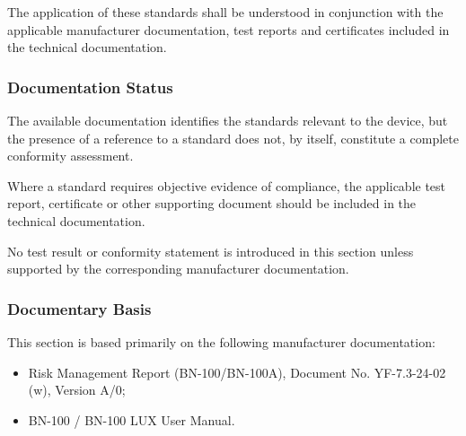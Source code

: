 The application of these standards shall be understood in conjunction with
the applicable manufacturer documentation, test reports and certificates
included in the technical documentation.

\subsubsection{Documentation Status}

The available documentation identifies the standards relevant to the device,
but the presence of a reference to a standard does not, by itself, constitute
a complete conformity assessment.

Where a standard requires objective evidence of compliance, the applicable
test report, certificate or other supporting document should be included in
the technical documentation.

No test result or conformity statement is introduced in this section unless
supported by the corresponding manufacturer documentation.

\subsubsection{Documentary Basis}

This section is based primarily on the following manufacturer documentation:

\begin{itemize}

    \item Risk Management Report (BN-100/BN-100A), Document No.
    YF-7.3-24-02 (w), Version A/0;

    \item BN-100 / BN-100 LUX User Manual.

\end{itemize}
